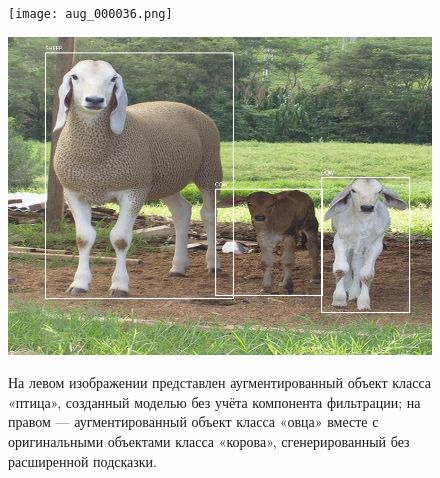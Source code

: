 \begin{figure}[htp]
  \centering
  \begin{minipage}[t]{0.4\textwidth}
    \centering
    \texttt{[image: aug\_000036.png]}
    \label{fig:img3}
  \end{minipage}%
  \hspace{0.05\textwidth}%
  \begin{minipage}[t]{0.4\textwidth}
    \centering
    \includegraphics[width=\linewidth]{images/aug_001299_wo_prompt.png}
    \label{fig:img3}
  \end{minipage}

  \caption{На левом изображении представлен аугментированный объект класса «птица», созданный моделью без учёта компонента фильтрации; на правом — аугментированный объект класса «овца» вместе с оригинальными объектами класса «корова», сгенерированный без расширенной подсказки.}
  \label{fig:comparison}
\end{figure}

\vspace{-20pt}

